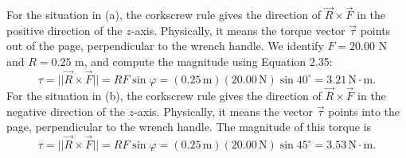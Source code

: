 \documentclass{report}
\begin{document}
    \bigbreak \noindent 
    For the situation in (a), the corkscrew rule gives the direction of $\vec{R} \times \vec{F}$ in the positive direction of the $z$-axis. Physically, it means the torque vector $\vec{\tau}$ points out of the page, perpendicular to the wrench handle. We identify $F = 20.00$ N and $R = 0.25$ m, and compute the magnitude using Equation 2.35:
    \[
        \tau = ||\vec{R} \times \vec{F}|| = RF\sin\varphi = (0.25\,\text{m})(20.00\,\text{N})\sin 40^\circ = 3.21\,\text{N}\cdot\text{m}.
    \]
    For the situation in (b), the corkscrew rule gives the direction of $\vec{R} \times \vec{F}$ in the negative direction of the $z$-axis. Physically, it means the vector $\vec{\tau}$ points into the page, perpendicular to the wrench handle. The magnitude of this torque is
    \[
        \tau = ||\vec{R} \times \vec{F}|| = RF\sin\varphi = (0.25\,\text{m})(20.00\,\text{N})\sin 45^\circ = 3.53\,\text{N}\cdot\text{m}.
    \]
\end{document}
